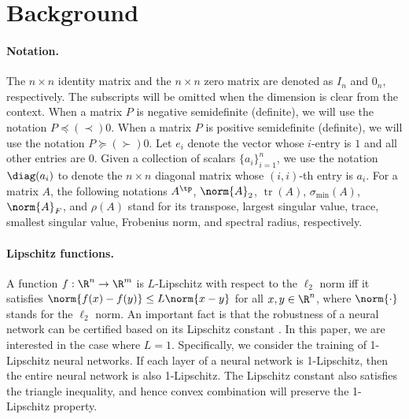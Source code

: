 \documentclass{article} \usepackage{iclr2023_conference,times}
\DeclareMathOperator*{\tr}{tr}
\newcommand{\0}{\mathbf{0} }
\begin{document}
\section{Background}

\paragraph{Notation.} The $n\times n$ identity matrix and the $n \times n$ zero matrix are denoted as $I_n$ and $0_n$, respectively. The subscripts will be omitted when the dimension is clear from the context. 
 When a matrix $P$ is negative semidefinite (definite), we will use the notation $P\preceq (\prec) 0$.  When a matrix $P$ is positive semidefinite (definite), we will use the notation $P\succeq (\succ) 0$.
Let $e_i$ denote the vector whose $i$-entry is $1$ and all other entries are $0$. Given a collection of scalars $\{a_i\}_{i=1}^n$,  we use the notation $\diag(a_i)$ to denote the $n\times n$ diagonal matrix whose $(i,i)$-th entry is $a_i$. For a matrix $A$, the following notations \(A^\tp\), \( \norm{A}_2 \),  \(\tr(A)\), \(\sigma_{\min}(A)\), \(\norm{A}_F\), and \(\rho(A) \) stand for its transpose, largest singular value, trace, smallest singular value, Frobenius norm, and spectral radius, respectively. 

\paragraph{Lipschitz functions.} A function $f:\R^n\rightarrow \R^m$ is $L$-Lipschitz with respect to the $\ell_2$ norm iff it satisfies $\norm{f(x)-f(y)}\le L \norm{x-y}$ for all $x, y\in \R^n$, where $\norm{\cdot}$ stands for the $\ell_2$ norm.
An important fact is that the robustness of a neural network can be certified based on its Lipschitz constant \citep{tsuzuku2018lipschitz}. 
In this paper, we are interested in the case where $L=1$. Specifically, we consider the training of 1-Lipschitz neural networks. If each layer of a neural network is 1-Lipschitz, then the entire neural network is also 1-Lipschitz. The Lipschitz constant also satisfies the triangle inequality, and hence convex combination will preserve the 1-Lipschitz property.
\end{document}
